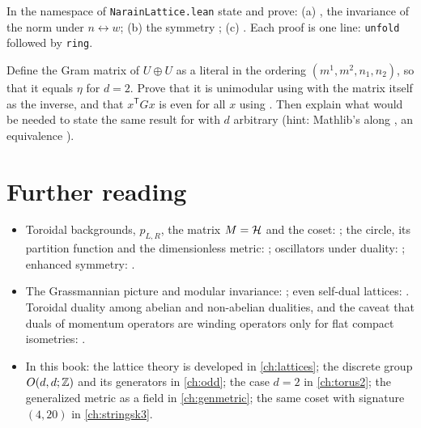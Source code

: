 \begin{exercise}
In the namespace of \texttt{NarainLattice.lean} state and prove: (a) ,
the invariance of the norm under $n\leftrightarrow w$; (b) the symmetry
; (c) . Each proof is one line:
\texttt{unfold} followed by \texttt{ring}.
\end{exercise}

\begin{exercise}\label{exc:narain:leaneta}
Define the Gram matrix of $U\oplus U$ as a literal  in the ordering
$(m^1,m^2,n_1,n_2)$, so that it equals $\eta$ for $d=2$. Prove that it is unimodular using
 with the matrix itself as the inverse, and that
$x^{\mathsf T}Gx$ is even for all $x$ using . Then
explain what would be needed to state the same result for  with $d$ arbitrary
(hint: Mathlib's  along , an equivalence
).
\end{exercise}

\section*{Further reading}
\begin{itemize}[leftmargin=*,itemsep=2pt]
\item Toroidal backgrounds, $p_{L,R}$, the matrix $M=\mathcal{H}$ and the coset:
 ; the circle, its partition function and the dimensionless
 metric: ; oscillators under duality:
 ; enhanced symmetry:
 .
\item The Grassmannian picture and modular invariance: ;
 even self-dual lattices: . Toroidal duality among abelian and
 non-abelian dualities, and the caveat that duals of momentum operators are winding operators
 only for flat compact isometries: .
\item In this book: the lattice theory is developed in \cref{ch:lattices}; the discrete group
 $O(d,d;\mathbb{Z})$ and its generators in \cref{ch:odd}; the case $d=2$ in \cref{ch:torus2}; the
 generalized metric as a field in \cref{ch:genmetric}; the same coset with signature
 $(4,20)$ in \cref{ch:stringsk3}.
\end{itemize}
